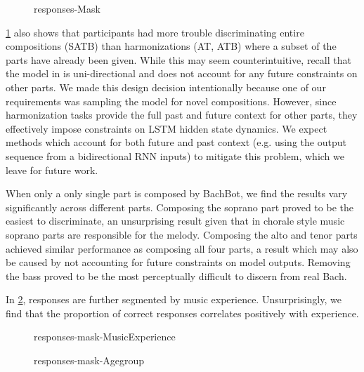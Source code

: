\begin{figure}[tb]
  \centering
  
  \caption{responses-Mask}
  \label{fig:responses-mask}
\end{figure}

\cref{fig:responses-mask} also shows that participants had more trouble
discriminating entire compositions (SATB) than harmonizations (AT, ATB) where a
subset of the parts have already been given. While this may seem
counterintuitive, recall that the model in  is uni-directional
and does not account for any future constraints on other parts. We made
this design decision intentionally because one of our requirements was sampling
the model for novel compositions. However, since harmonization tasks provide
the full past and future context for other parts, they effectively impose constraints
on LSTM hidden state dynamics. We expect methods which account for both future and past
context (e.g. using the output sequence from a bidirectional RNN inputs)
to mitigate this problem, which we leave for future work.

When only a only single part is composed by BachBot, we find the results vary significantly
across different parts. Composing the soprano part proved to be the easiest to
discriminate, an unsurprising result given that in chorale style music soprano parts
are responsible for the melody. Composing the alto and tenor parts achieved
similar performance as composing all four parts, a result which may also be caused by
not accounting for future constraints on model outputs. Removing the bass proved
to be the most perceptually difficult to discern from real Bach.

In \cref{fig:responses-mask-musicExperience}, responses are further segmented
by music experience. Unsurprisingly, we find that the proportion of correct responses
correlates positively with experience.

\begin{figure}[tb]
  \centering
  
  \caption{responses-mask-MusicExperience}
  \label{fig:responses-mask-musicExperience}
\end{figure}

\begin{figure}[tb]
  \centering
  
  \caption{responses-mask-Agegroup}
  \label{fig:responses-mask-agegroup}
\end{figure}

